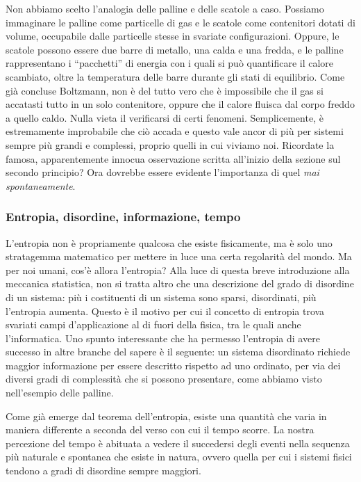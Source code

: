 Non abbiamo scelto l'analogia delle palline e delle scatole a caso.
Possiamo immaginare le palline come particelle di gas e le scatole
come contenitori dotati di volume, occupabile dalle particelle stesse
in svariate configurazioni. Oppure, le scatole possono essere
due barre di metallo, una calda e una fredda, e le palline
rappresentano i ``pacchetti'' di energia con i quali si può
quantificare il calore scambiato, oltre la temperatura delle barre durante
gli stati di equilibrio. Come già concluse Boltzmann, non è
del tutto vero che è impossibile che il gas si accatasti
tutto in un solo contenitore, oppure che il calore fluisca
dal corpo freddo a quello caldo. Nulla vieta il verificarsi di
certi fenomeni. Semplicemente, è estremamente
improbabile che ciò accada e questo vale ancor di più per sistemi
sempre più grandi e complessi, proprio quelli in cui viviamo noi.
Ricordate la famosa, apparentemente innocua osservazione scritta
all'inizio della sezione sul secondo principio? Ora dovrebbe essere
evidente l'importanza di quel \emph{mai spontaneamente}.

\subsubsection*{Entropia, disordine, informazione, tempo}
L'entropia non è propriamente qualcosa che esiste fisicamente,
ma è solo uno stratagemma matematico per mettere in luce una
certa regolarità del mondo.
Ma per noi umani, cos'è allora l'entropia? Alla luce di questa breve introduzione
alla meccanica statistica, non si tratta altro che una descrizione
del grado di disordine di un sistema: più i costituenti di un
sistema sono sparsi, disordinati, più l'entropia aumenta. Questo
è il motivo per cui il concetto di entropia trova svariati campi
d'applicazione al di fuori della fisica, tra le quali anche
l'informatica. Uno spunto interessante che ha permesso l'entropia
di avere successo in altre branche del sapere è il seguente: un
sistema disordinato richiede maggior informazione per essere
descritto rispetto ad uno ordinato, per via dei diversi gradi
di complessità che si possono presentare, come abbiamo visto
nell'esempio delle palline.

Come già emerge dal teorema dell'entropia, esiste una quantità
che varia in maniera differente a seconda del verso con cui il
tempo scorre. La nostra percezione del tempo è abituata a vedere
il succedersi degli eventi nella sequenza più naturale e spontanea
che esiste in natura, ovvero quella per cui i sistemi fisici tendono
a gradi di disordine sempre maggiori.


